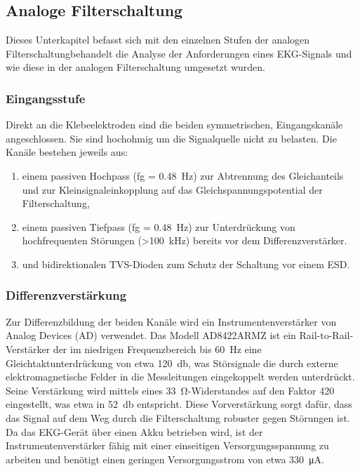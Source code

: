 
\subsection{Analoge Filterschaltung}

Dieses Unterkapitel befasst sich mit den einzelnen Stufen der analogen Filterschaltungbehandelt die Analyse der Anforderungen eines EKG-Signals und wie diese in der analogen Filterschaltung umgesetzt wurden. 

\subsubsection{Eingangsstufe}

Direkt an die Klebeelektroden sind die beiden symmetrischen, Eingangskanäle angeschlossen. Sie sind hochohmig um die Signalquelle nicht zu belasten. Die Kanäle bestehen jeweils aus:

\begin{enumerate}

\item einem passiven Hochpass (fg = \SI{0,48}{\hertz}) zur Abtrennung des Gleichanteils und zur Kleinsignaleinkopplung auf das Gleichspannungspotential der Filterschaltung,

\item einem passiven Tiefpass (fg = \SI{0,48}{\hertz}) zur Unterdrückung von hochfrequenten Störungen (>\SI{100}{\kilo\hertz}) bereits vor dem Differenzverstärker. 

\item und bidirektionalen TVS-Dioden zum Schutz der Schaltung vor einem ESD.

\end{enumerate}

\subsubsection{Differenzverstärkung}

Zur Differenzbildung der beiden Kanäle wird ein Instrumentenverstärker von Analog Devices (AD) verwendet. Das Modell AD8422ARMZ ist ein Rail-to-Rail-Verstärker der im niedrigen Frequenzbereich bis \SI{60}{\hertz} eine Gleichtaktunterdrückung von etwa \SI{120}{\decibel}, was Störsignale die durch externe elektromagnetische Felder in die Messleitungen eingekoppelt werden unterdrückt. Seine Verstärkung wird mittels eines \SI{33}{\ohm}-Widerstandes auf den Faktor 420 eingestellt, was etwa in \SI{52}{\decibel} entspricht. Diese Vorverstärkung sorgt dafür, dass das Signal auf dem Weg durch die Filterschaltung robuster gegen Störungen ist. Da das EKG-Gerät über einen Akku betrieben wird, ist der Instrumentenverstärker fähig mit einer einseitigen Versorgungsspannung zu arbeiten und benötigt einen geringen Versorgungsstrom von etwa \SI{330}{\micro\ampere}. 

